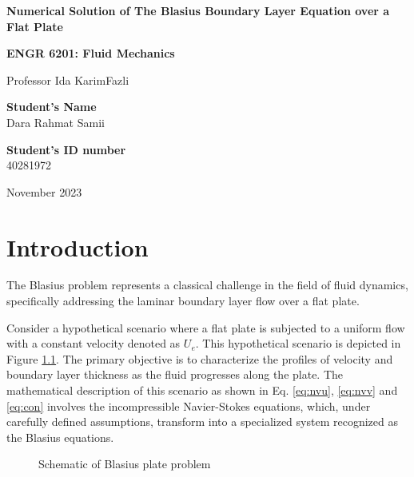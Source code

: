 \documentclass[]{report}
\date{November 2023}
\begin{document}
\begin{titlepage}
	\begin{center}
		\vspace*{1cm}

		
		
		\vspace*{2cm}

            \textbf{\LARGE Numerical Solution of The Blasius Boundary Layer Equation over a Flat Plate}

            \vspace*{3cm}
            
		\textbf{\Large ENGR 6201: Fluid Mechanics}
		
		\vspace{0.5cm}
		Professor Ida KarimFazli
		
		\vfill

		
		\textbf{Student's Name}\\
		Dara Rahmat Samii

            \vspace{2cm}

            \textbf{Student's ID number}\\
            40281972
		

		\vfill

		
		November 2023
		
	\end{center}
\end{titlepage}

\chapter{Introduction}
The Blasius problem represents a classical challenge in the field of fluid dynamics, specifically addressing the laminar boundary layer flow over a flat plate.

Consider a hypothetical scenario where a flat plate is subjected to a uniform flow with a constant velocity denoted as $U_e$. This hypothetical scenario is depicted in Figure \ref{fig:schematic}. The primary objective is to characterize the profiles of velocity and boundary layer thickness as the fluid progresses along the plate. The mathematical description of this scenario as shown in Eq. \ref{eq:nvu}, \ref{eq:nvv} and \ref{eq:con} involves the incompressible Navier-Stokes equations, which, under carefully defined assumptions, transform into a specialized system recognized as the Blasius equations.
\begin{figure}[h]
    \centering
    
    \caption{Schematic of Blasius plate problem\footnotemark}
    \label{fig:schematic}
\end{figure}
\end{document}
